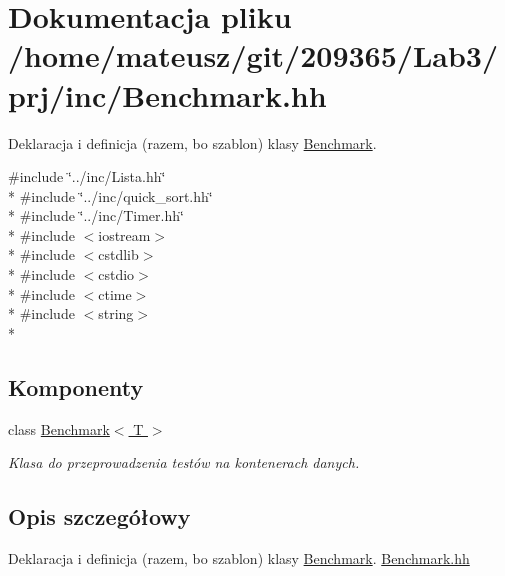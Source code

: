 \hypertarget{_benchmark_8hh}{\section{Dokumentacja pliku /home/mateusz/git/209365/\-Lab3/prj/inc/\-Benchmark.hh}
\label{_benchmark_8hh}
}


Deklaracja i definicja (razem, bo szablon) klasy \hyperlink{class_benchmark}{Benchmark}.  


{\ttfamily \#include \char`\"{}../inc/\-Lista.\-hh\char`\"{}}\\*
{\ttfamily \#include \char`\"{}../inc/quick\-\_\-sort.\-hh\char`\"{}}\\*
{\ttfamily \#include \char`\"{}../inc/\-Timer.\-hh\char`\"{}}\\*
{\ttfamily \#include $<$iostream$>$}\\*
{\ttfamily \#include $<$cstdlib$>$}\\*
{\ttfamily \#include $<$cstdio$>$}\\*
{\ttfamily \#include $<$ctime$>$}\\*
{\ttfamily \#include $<$string$>$}\\*
\subsection*{Komponenty}
\begin{DoxyCompactItemize}
\item 
class \hyperlink{class_benchmark}{Benchmark$<$ T $>$}
\begin{DoxyCompactList}\small\item\em Klasa do przeprowadzenia testów na kontenerach danych. \end{DoxyCompactList}\end{DoxyCompactItemize}


\subsection{Opis szczegółowy}
Deklaracja i definicja (razem, bo szablon) klasy \hyperlink{class_benchmark}{Benchmark}. \hyperlink{_benchmark_8hh}{Benchmark.\-hh} 